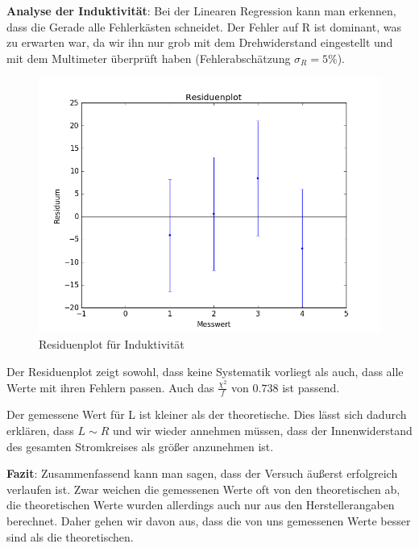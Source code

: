\documentclass[12pt,a4paper]{article}
\begin{document}
\textbf{Analyse der Induktivität}: \newline   
Bei der Linearen Regression kann man erkennen, dass  die Gerade alle Fehlerkästen schneidet. Der Fehler auf R ist dominant, was zu erwarten war, da wir ihn nur grob mit dem Drehwiderstand eingestellt und mit dem Multimeter überprüft haben (Fehlerabschätzung $\sigma_R=5\%$). 
\begin{figure}[H]
 \caption{Residuenplot für Induktivität}
 \centering
 \includegraphics[scale=0.5]{Bilder/ResiduenplotInduktivitaeten.png}
\end{figure}
 
Der Residuenplot zeigt sowohl, dass keine Systematik vorliegt als auch, dass alle Werte mit ihren Fehlern passen. Auch das $\frac{\chi^2}{f}$ von $0.738$ ist passend. \newline

Der gemessene Wert für L ist kleiner als der theoretische. Dies lässt sich dadurch erklären, dass $L\sim R$ und wir wieder annehmen müssen, dass der Innenwiderstand  des gesamten Stromkreises als größer anzunehmen ist.

\textbf{Fazit}:\newline
Zusammenfassend kann man sagen, dass der Versuch äußerst erfolgreich verlaufen ist. Zwar weichen die gemessenen Werte oft von den theoretischen ab, die theoretischen Werte wurden allerdings auch nur aus den Herstellerangaben berechnet. Daher gehen wir davon aus, dass die von uns gemessenen Werte besser sind als die theoretischen.  
\end{document}
